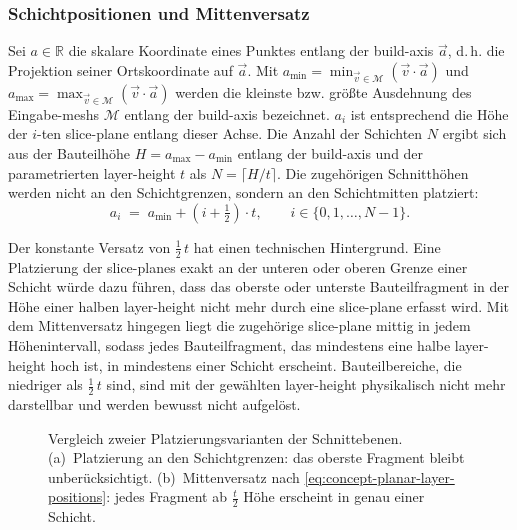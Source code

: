             \subsubsection{Schichtpositionen und Mittenversatz}\label{subsubsec:concept-planar-layer-positions}
                Sei $a \in \mathbb{R}$ die skalare Koordinate eines Punktes entlang der \gls{build-axis} $\vec{a}$, d.\,h. die Projektion seiner Ortskoordinate auf $\vec{a}$.
                Mit $a_{\min} = \min_{\vec{v} \in \mathcal{M}} (\vec{v} \cdot \vec{a})$ und $a_{\max} = \max_{\vec{v} \in \mathcal{M}} (\vec{v} \cdot \vec{a})$ werden die kleinste bzw. größte Ausdehnung des Eingabe-\glspl{mesh} $\mathcal{M}$ entlang der \gls{build-axis} bezeichnet.
                $a_i$ ist entsprechend die Höhe der $i$-ten \gls{slice-plane} entlang dieser Achse.
                Die Anzahl der Schichten $N$ ergibt sich aus der Bauteilhöhe $H = a_{\max} - a_{\min}$ entlang der \gls{build-axis} und der parametrierten \gls{layer-height} $t$ als $N = \lceil H / t \rceil$.
                Die zugehörigen Schnitthöhen werden nicht an den Schichtgrenzen, sondern an den Schichtmitten platziert:
                \begin{equation}
                    a_i \;=\; a_{\min} + \left(i + \tfrac{1}{2}\right) \cdot t,
                    \qquad i \in \{0, 1, \dots, N-1\}.
                    \label{eq:concept-planar-layer-positions}
                \end{equation}

                Der konstante Versatz von $\tfrac{1}{2}\,t$ hat einen technischen Hintergrund.
                Eine Platzierung der \glspl{slice-plane} exakt an der unteren oder oberen Grenze einer Schicht würde dazu führen, dass das oberste oder unterste Bauteilfragment in der Höhe einer halben \gls{layer-height} nicht mehr durch eine \gls{slice-plane} erfasst wird.
                Mit dem Mittenversatz hingegen liegt die zugehörige \gls{slice-plane} mittig in jedem Höhenintervall, sodass jedes Bauteilfragment, das mindestens eine halbe \gls{layer-height} hoch ist, in mindestens einer Schicht erscheint.
                Bauteilbereiche, die niedriger als $\tfrac{1}{2}\,t$ sind, sind mit der gewählten \gls{layer-height} physikalisch nicht mehr darstellbar und werden bewusst nicht aufgelöst.

                \begin{figure}[!ht]
                    \centering
                        
                    \caption[Mittenversatz der Schnittebenen im planaren Algorithmus]{
                        Vergleich zweier Platzierungsvarianten der Schnittebenen.
                        (a)~Platzierung an den Schichtgrenzen: das oberste Fragment bleibt unberücksichtigt.
                        (b)~Mittenversatz nach \cref{eq:concept-planar-layer-positions}: jedes Fragment ab $\tfrac{t}{2}$ Höhe erscheint in genau einer Schicht.
                    }
                    \label{fig:concept-planar-mid-offset}
                \end{figure}

